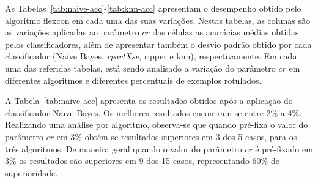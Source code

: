         As Tabelas~\ref{tab:naive-acc}-\ref{tab:knn-acc} apresentam o desempenho obtido pelo algoritmo \ac{flexcon} em cada uma das suas variações. Nestas tabelas, as colunas são as variações aplicadas ao parâmetro $cr$ das células as acurácias médias obtidas pelos classificadores, além de apresentar também o desvio padrão obtido por cada classificador (Na\"ive Bayes, \textit{rpartXse}, \ac{ripper} e \ac{knn}), respectivamente. Em cada uma das referidas tabelas, está sendo analisado a variação do parâmetro $cr$ em diferentes algoritmos e diferentes percentuais de exemplos rotulados.
        
        A Tabela~\ref{tab:naive-acc} apresenta os resultados obtidos após a aplicação do classificador Na\"ive Bayes. Os melhores resultados encontram\hyp{se} entre 2\% a 4\%. Realizando uma análise por algoritmo, observa\hyp{se} que quando pré\hyp{fixa} o valor do parâmetro $cr$ em 3\% obtém\hyp{se} resultados superiores em 3 dos 5 casos, para os três algoritmos. De maneira geral quando o valor do parâmetro $cr$ é pré\hyp{fixado} em 3\% os resultados são superiores em 9 dos 15 casos, representando 60\% de superioridade.
    
